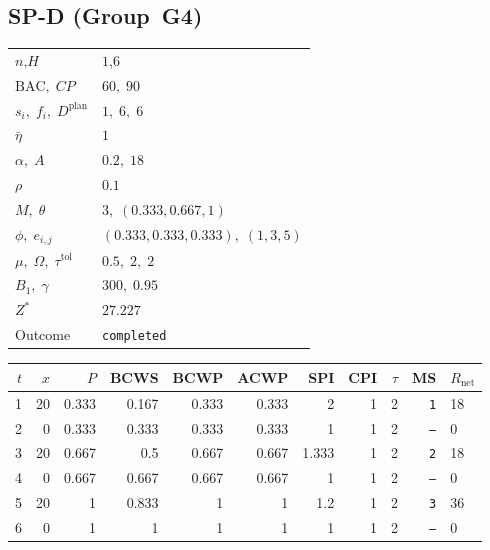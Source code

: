 \documentclass[12pt, a4paper]{article}
\newcommand{\BAC}{\mathrm{BAC}}
\begin{document}
\newpage

\subsection*{SP-D  (Group~G4)}
\begin{center}
\begin{tabular}{ll}
\toprule
$n$,\;$H$ & $1$,\;$6$ \\
$\BAC,\;CP$ & $60,\;90$ \\
$s_i,\;f_i,\;D^{\mathrm{plan}}$ & $1,\;6,\;6$ \\
$\bar\eta$ & $1$ \\
$\alpha,\;A$ & $0.2,\;18$ \\
$\rho$ & $0.1$ \\
$M,\;\theta$ & $3,\;(0.333,0.667,1)$ \\
$\phi,\;e_{i,j}$ & $(0.333,0.333,0.333),\;(1,3,5)$ \\
$\mu,\;\Omega,\;\tau^{\mathrm{tol}}$ & $0.5,\;2,\;2$ \\
$B_1,\;\gamma$ & $300,\;0.95$ \\
$Z^*$ & $27.227$ \\
Outcome & \texttt{completed} \\
\bottomrule
\end{tabular}
\end{center}

\begin{center}
\begin{tabular}{rrrrrrrrrrl}
\toprule
$t$ & $x$ & $P$ & BCWS & BCWP & ACWP & SPI & CPI & $\tau$ & MS & $R_{\mathrm{net}}$\\
\midrule
1 & 20 & 0.333 & 0.167 & 0.333 & 0.333 & 2 & 1 & 2 & \texttt{1} & 18 \\
2 & 0 & 0.333 & 0.333 & 0.333 & 0.333 & 1 & 1 & 2 & \texttt{---} & 0 \\
3 & 20 & 0.667 & 0.5 & 0.667 & 0.667 & 1.333 & 1 & 2 & \texttt{2} & 18 \\
4 & 0 & 0.667 & 0.667 & 0.667 & 0.667 & 1 & 1 & 2 & \texttt{---} & 0 \\
5 & 20 & 1 & 0.833 & 1 & 1 & 1.2 & 1 & 2 & \texttt{3} & 36 \\
6 & 0 & 1 & 1 & 1 & 1 & 1 & 1 & 2 & \texttt{---} & 0 \\
\bottomrule
\end{tabular}
\end{center}
\end{document}
